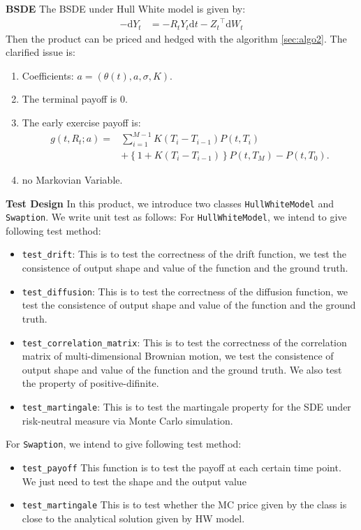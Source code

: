 \documentclass[11pt,a4paper]{article}
\theoremstyle{remark}
\begin{document}
	\noindent \textbf{BSDE} The BSDE under Hull White model is given by:
	\begin{align*}\label{bsde: hw}
		-\mathrm{d} Y_{t} &= -R_t Y_t \mathrm{d} t - {Z_t}^{\top} \mathrm{d}W_t
	\end{align*}
	Then the product can be priced and hedged with the algorithm \ref{sec:algo2}.
	The clarified issue is:
	\begin{enumerate}
		\item Coefficients: $a = (\theta(t), a, \sigma, K)$.
		\item The terminal payoff is $0$.
		\item The early exercise payoff is:
		\begin{align}
			g(t,  R_t; a) = & \sum_{i=1}^{M-1}K\left(T_i-T_{i-1}\right) P\left(t, T_{i}\right) \\
			& +\left\{1+K\left(T_i-T_{i-1}\right)\right\} P\left(t, T_M\right)-P\left(t, T_0\right) .
		\end{align}
		\item no Markovian Variable.
	\end{enumerate}
	\noindent \textbf{Test Design}
	In this product, we introduce two classes \texttt{HullWhiteModel} and \texttt{Swaption}. We write unit test as follows:
	For \texttt{HullWhiteModel}, we intend to give following test method:
	\begin{itemize}
		\item  \texttt{test\_drift}: This is to test the correctness of the drift function, we test the consistence of output shape and value of the function and the ground truth.
		\item  \texttt{test\_diffusion}: This is to test the correctness of the diffusion function, we test the consistence of output shape and value of the function and the ground truth.
		
		\item  \texttt{test\_correlation\_matrix}: This is to test the correctness of the correlation matrix of multi-dimensional Brownian motion, we test the consistence of output shape and value of the function and the ground truth. We also test the property of positive-difinite.
		
		\item  \texttt{test\_martingale}: This is to test the martingale property for the SDE under risk-neutral measure via Monte Carlo simulation.
	\end{itemize}
	For \texttt{Swaption}, we intend to give following test method:
	\begin{itemize}
		\item  \texttt{test\_payoff} This function is to test the payoff at each certain time point. We just need to test the shape and the output value
		
		\item \texttt{test\_martingale} This is to test whether the MC price given by the class is close to the analytical solution given by HW model.
	\end{itemize}
	
\end{document}
